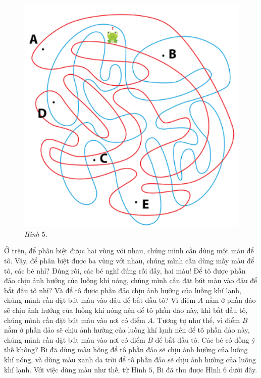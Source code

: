 \begin{multicols}{2}
\begin{figure}[H]
		\includegraphics[width=1\linewidth]{5}
		\caption{\textit{\small Hình $5.$}}
		\vspace*{-10pt}
	\end{figure}
	Ở trên, để phân biệt được hai vùng với nhau, chúng mình cần dùng một màu để tô. Vậy, để phân biệt được ba vùng với nhau, chúng mình cần dùng mấy màu để tô, các bé nhỉ? Đúng rồi, các bé nghĩ đúng rồi đấy, hai màu! Để tô được phần đảo chịu ảnh hưởng của luồng khí nóng, chúng mình cần đặt bút màu vào đâu để bắt đầu tô nhỉ? Và để tô được phần đảo chịu ảnh hưởng của luồng khí lạnh, chúng mình cần đặt bút màu vào đâu để bắt đầu tô? Vì điểm $A$ nằm ở phần đảo sẽ chịu ảnh hưởng của luồng khí nóng nên để tô phần đảo này, khi bắt đầu tô, chúng  mình cần đặt bút màu vào nơi có điểm $A$. Tương tự như thế, vì điểm $B$ nằm ở phần đảo sẽ chịu ảnh hưởng của luồng khí lạnh nên để tô phần đảo này, chúng mình cần đặt bút màu vào nơi có điểm $B$ để bắt đầu tô. Các bé có đồng ý  thế không?
	\vskip 0.1cm
	Bi đã dùng màu hồng để tô phần đảo sẽ chịu ảnh hưởng của luồng khí nóng, và dùng màu xanh da trời để tô phần đảo sẽ chịu ảnh hưởng của luồng khí lạnh. Với việc dùng màu như thế, từ Hình $5$, Bi đã thu được Hình $6$ dưới đây.
	\begin{figure}[H]
		\centering
		\vspace*{-5pt}

\end{figure}
\end{multicols}
